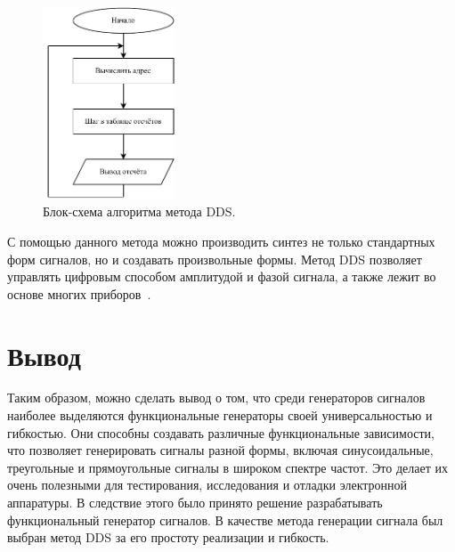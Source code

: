 	\begin{figure}[H]
    \centering
    \includegraphics[width=0.35\textwidth]{../image/dds_block.pdf}
    \caption{Блок-схема алгоритма метода DDS.}
	\end{figure}
	
	С помощью данного метода можно производить синтез не только стандартных форм сигналов, но и создавать произвольные формы. Метод DDS позволяет управлять цифровым способом амплитудой и фазой сигнала, а также лежит во основе многих приборов~\cite{dds_en}.
	
\section{Вывод}
	Таким образом, можно сделать вывод о том, что среди генераторов сигналов наиболее  выделяются функциональные генераторы своей универсальностью и гибкостью. Они способны создавать различные функциональные зависимости, что позволяет генерировать сигналы разной формы, включая синусоидальные, треугольные и прямоугольные сигналы в широком спектре частот. Это делает их очень полезными для тестирования, исследования и отладки электронной аппаратуры. В следствие этого было принято решение разрабатывать функциональный генератор сигналов. В качестве метода генерации сигнала был выбран метод DDS за его простоту реализации и гибкость.
	
	